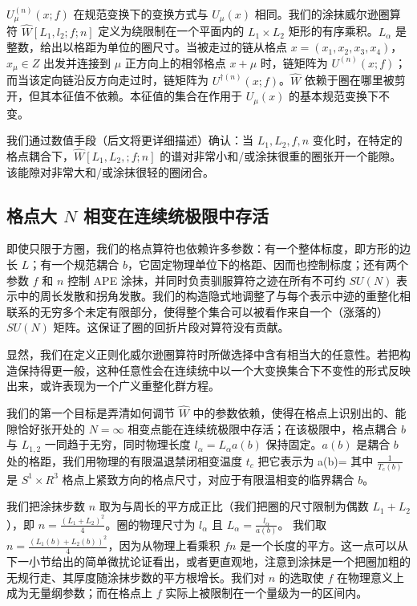 $U^{(n)}_\mu (x;f)$ 在规范变换下的变换方式与 $U_\mu (x)$ 相同。我们的涂抹威尔逊圈算符 $\hat W [L_1,l_2 ; f ; n]$ 定义为绕限制在一个平面内的 $L_1 \times L_2$ 矩形的有序乘积。$L_\alpha$ 是整数，给出以格距为单位的圈尺寸。当被走过的链从格点 $x=(x_1,x_2,x_3,x_4)$，$ x_\mu\in Z$ 出发并连接到 $\mu$ 正方向上的相邻格点 $x+\mu$ 时，链矩阵为 $U^{(n)}(x;f)$；而当该定向链沿反方向走过时，链矩阵为 $U^{\dagger (n)}(x;f)$。$\hat W$ 依赖于圈在哪里被剪开，但其本征值不依赖。本征值的集合在作用于 $U_\mu (x)$ 的基本规范变换下不变。

我们通过数值手段（后文将更详细描述）确认：当 $L_1 , L_2 , f, n$ 变化时，在特定的格点耦合下，$\hat W [L_1 , L_2 ,; f ; n] $ 的谱对非常小和/或涂抹很重的圈张开一个能隙。该能隙对非常大和/或涂抹很轻的圈闭合。


\subsection{格点大 $N$ 相变在连续统极限中存活}

即使只限于方圈，我们的格点算符也依赖许多参数：有一个整体标度，即方形的边长 $L$；有一个规范耦合 $b$，它固定物理单位下的格距、因而也控制标度；还有两个参数 $f$ 和 $n$ 控制 APE 涂抹，并同时负责驯服算符之迹在所有不可约 $SU(N)$ 表示中的周长发散和拐角发散。我们的构造隐式地调整了与每个表示中迹的重整化相联系的无穷多个未定有限部分，使得整个集合可以被看作来自一个（涨落的）$SU(N)$ 矩阵。这保证了圈的回折片段对算符没有贡献。

显然，我们在定义正则化威尔逊圈算符时所做选择中含有相当大的任意性。若把构造保持得更一般，这种任意性会在连续统中以一个大变换集合下不变性的形式反映出来，或许表现为一个广义重整化群方程。

我们的第一个目标是弄清如何调节 $\hat W$ 中的参数依赖，使得在格点上识别出的、能隙恰好张开处的 $N=\infty$ 相变点能在连续统极限中存活；在该极限中，格点耦合 $b$ 与 $L_{1,2}$ 一同趋于无穷，同时物理长度 $l_\alpha = L_\alpha a(b)$ 保持固定。$a(b)$ 是耦合 $b$ 处的格距，我们用物理的有限温退禁闭相变温度 $t_c$ 把它表示为
\be
a(b)=
\ee
其中 $\frac{1}{T_c(b)}$ 是 $S^1\times R^3$ 格点上紧致方向的格点尺寸，对应于有限温相变的临界耦合 $b$。

我们把涂抹步数 $n$ 取为与周长的平方成正比（我们把圈的尺寸限制为偶数 $L_1+L_2$），即 $n=\frac{(L_1+L_2)^2}{4}$。圈的物理尺寸为 $l_\alpha$ 且 $L_\alpha = \frac{l_\alpha}{a(b)}$。
我们取 $n=\frac{(L_1 (b) + L_2 (b))^2}{4}$，因为从物理上看乘积 $f n$ 是一个长度的平方。这一点可以从下一小节给出的简单微扰论证看出，或者更直观地，注意到涂抹是一个把圈加粗的无规行走、其厚度随涂抹步数的平方根增长。我们对 $n$ 的选取使 $f$ 在物理意义上成为无量纲参数；而在格点上 $f$ 实际上被限制在一个量级为一的区间内。

